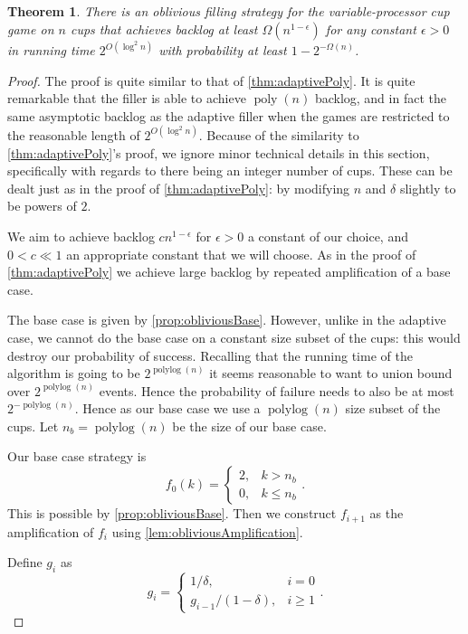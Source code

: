 \documentclass[twocolumn]{article}[10pt]
\DeclareMathOperator{\polylog}{\text{polylog}}
\DeclareMathOperator{\poly}{\text{poly}}
\newtheorem{theorem}{Theorem}
\begin{document}
\begin{theorem}
  \label{thm:obliviousPoly}
  There is an oblivious filling strategy for the
  variable-processor cup game on $n$ cups that achieves backlog
  at least $\Omega(n^{1-\epsilon})$ for any constant $\epsilon
  >0$ in running time $2^{O(\log^2 n)}$ with probability at least
  $1-2^{-\Omega(n)}$.
\end{theorem}
\begin{proof}
  The proof is quite similar to that of \cref{thm:adaptivePoly}.
  It is quite remarkable that the filler is able to 
  achieve $\poly(n)$ backlog, and in fact the same asymptotic backlog as the
  adaptive filler when the games are restricted to the reasonable length of
  $2^{O(\log^2 n)}$. Because of the similarity to 
  \cref{thm:adaptivePoly}'s proof, we ignore minor technical details in this
  section, specifically with regards to there being an integer number of cups.
  These can be dealt just as in the proof of \cref{thm:adaptivePoly}: by
  modifying $n$ and $\delta$ slightly to be powers of $2$.

  We aim to achieve backlog $cn^{1-\epsilon}$ for $\epsilon >  0$ a constant of
  our choice, and $0< c \ll 1$ an appropriate constant that we will choose.
  As in the proof of \cref{thm:adaptivePoly} we achieve large backlog
  by repeated amplification of a base case. 

  The base case is given by \cref{prop:obliviousBase}. However,
  unlike in the adaptive case, we cannot do the base case on a constant size
  subset of the cups: this would destroy our probability of success. Recalling
  that the running time of the algorithm is going to be $2^{\polylog(n)}$ it
  seems reasonable to want to union bound over $2^{\polylog(n)}$ events. Hence
  the probability of failure needs to also be at most $2^{-\polylog(n)}$.
  Hence as our base case we use a $\polylog(n)$ size subset of the cups. 
  Let $n_b = \polylog(n)$ be the size of our base case.

  Our base case strategy is 
  $$
  f_0(k)=
  \begin{cases}
    2, & k > n_b\\
    0, & k \le n_b
  \end{cases}.$$
  This is possible by \cref{prop:obliviousBase}.
  Then we construct $f_{i+1}$ as the amplification of $f_i$ using \cref{lem:obliviousAmplification}.

  Define $g_i$ as 
  $$
  g_i =
  \begin{cases}
    1/\delta, & i=0\\
    g_{i-1}/(1-\delta), & i\ge 1 
  \end{cases}.$$


\end{proof}
\end{document}
